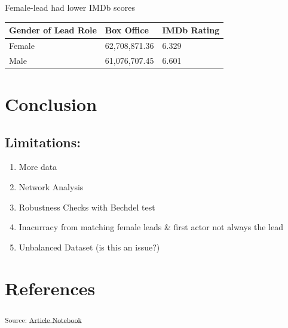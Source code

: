 \documentclass[
]{agujournal2019}
\providecommand{\tightlist}{%
  \setlength{\itemsep}{0pt}\setlength{\parskip}{0pt}}\usepackage{longtable,booktabs,array}
\begin{document}
Female-lead had lower IMDb scores

\begin{longtable}[]{@{}lll@{}}
\toprule\noalign{}
Gender of Lead Role & Box Office & IMDb Rating \\
\midrule\noalign{}
\endhead
\bottomrule\noalign{}
\endlastfoot
Female & 62,708,871.36 & 6.329 \\
Male & 61,076,707.45 & 6.601 \\
\end{longtable}

\section{Conclusion}\label{sec-conclusion}

\subsection{Limitations:}\label{limitations}

\begin{enumerate}
\def\labelenumi{\arabic{enumi}.}
\tightlist
\item
  More data
\item
  Network Analysis
\item
  Robustness Checks with Bechdel test
\item
  Inacurracy from matching female leads \& first actor not always the
  lead
\item
  Unbalanced Dataset (is this an issue?)
\end{enumerate}

\section*{References}\label{references}

\vspace{1em}

\textsubscript{Source:
\href{https://ehealy19.github.io/Matching_Movies/index-preview.html}{Article
Notebook}}
\end{document}
